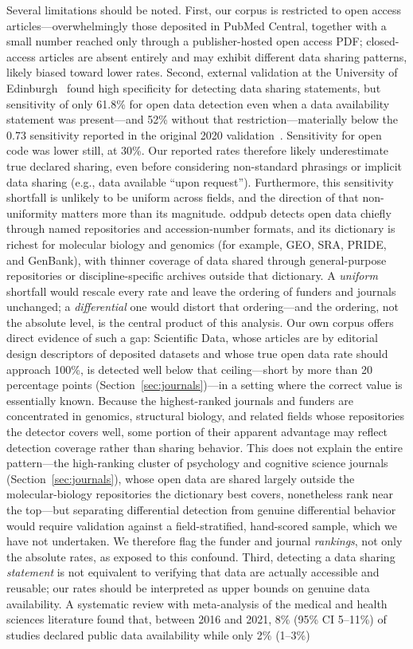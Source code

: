 Several limitations should be noted. First, our corpus is restricted to open access articles---overwhelmingly those deposited in PubMed Central, together with a small number reached only through a publisher-hosted open access PDF; closed-access articles are absent entirely and may exhibit different data sharing patterns, likely biased toward lower rates. Second, external validation at the University of Edinburgh~\cite{Deeb2025-iw} found high specificity for detecting data sharing statements, but sensitivity of only 61.8\% for open data detection even when a data availability statement was present---and 52\% without that restriction---materially below the 0.73 sensitivity reported in the original 2020 validation~\cite{Riedel2020-fk}. Sensitivity for open code was lower still, at 30\%. Our reported rates therefore likely underestimate true declared sharing, even before considering non-standard phrasings or implicit data sharing (e.g., data available ``upon request''). Furthermore, this sensitivity shortfall is unlikely to be uniform across fields, and the direction of that non-uniformity matters more than its magnitude. oddpub detects open data chiefly through named repositories and accession-number formats, and its dictionary is richest for molecular biology and genomics (for example, GEO, SRA, PRIDE, and GenBank), with thinner coverage of data shared through general-purpose repositories or discipline-specific archives outside that dictionary. A \emph{uniform} shortfall would rescale every rate and leave the ordering of funders and journals unchanged; a \emph{differential} one would distort that ordering---and the ordering, not the absolute level, is the central product of this analysis. Our own corpus offers direct evidence of such a gap: Scientific Data, whose articles are by editorial design descriptors of deposited datasets and whose true open data rate should approach 100\%, is detected well below that ceiling---short by more than 20 percentage points (Section~\ref{sec:journals})---in a setting where the correct value is essentially known. Because the highest-ranked journals and funders are concentrated in genomics, structural biology, and related fields whose repositories the detector covers well, some portion of their apparent advantage may reflect detection coverage rather than sharing behavior. This does not explain the entire pattern---the high-ranking cluster of psychology and cognitive science journals (Section~\ref{sec:journals}), whose open data are shared largely outside the molecular-biology repositories the dictionary best covers, nonetheless rank near the top---but separating differential detection from genuine differential behavior would require validation against a field-stratified, hand-scored sample, which we have not undertaken. We therefore flag the funder and journal \emph{rankings}, not only the absolute rates, as exposed to this confound. Third, detecting a data sharing \emph{statement} is not equivalent to verifying that data are actually accessible and reusable; our rates should be interpreted as upper bounds on genuine data availability. A systematic review with meta-analysis of the medical and health sciences literature found that, between 2016 and 2021, 8\% (95\% CI 5--11\%) of studies declared public data availability while only 2\% (1--3\%) 